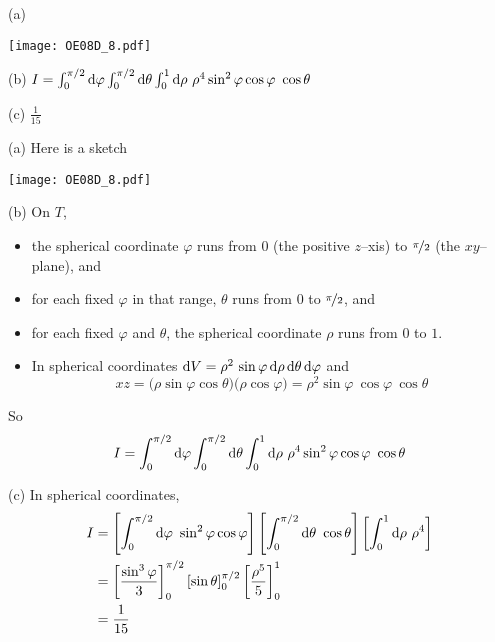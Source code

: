 %

\begin{answer}
(a)
\begin{center}
     \texttt{[image: OE08D\_8.pdf]}
\end{center}

(b) $I=\int_0^{\pi/2}\dee{\varphi}\int_0^{\pi/2}\dee{\theta}\int_0^1\dee{\rho}\ 
         \rho^4\sin^2\varphi\cos\varphi\ \cos\theta$

(c) $\frac{1}{15}$
\end{answer}

\begin{solution}
(a) Here is a sketch
\begin{center}
     \texttt{[image: OE08D\_8.pdf]}
\end{center}


(b) On $T$,
\begin{itemize}
\item
the spherical coordinate $\varphi$ runs from $0$ (the positive $z$--xis)
to $\nicefrac{\pi}{2}$ (the $xy$--plane), and
\item 
for each fixed $\varphi$ in that range,
$\theta$ runs from $0$ to $\nicefrac{\pi}{2}$, and
\item
for each fixed $\varphi$ and $\theta$, the spherical coordinate
$\rho$ runs from $0$ to $1$.
\item
In spherical coordinates 
  $\mathrm{d}V=\rho^2\,\sin\varphi\,\mathrm{d}\rho\,\mathrm{d}\theta\, \mathrm{d}\varphi$
and
\begin{equation*}
   xz=\big(\rho\sin\varphi\cos\theta\big)\big(\rho\cos\varphi\big)
      =\rho^2 \sin\varphi\ \cos\varphi\ \cos\theta
\end{equation*}
\end{itemize}
So
\begin{align*}
I=\int_0^{\pi/2}\dee{\varphi}\int_0^{\pi/2}\dee{\theta}\int_0^1\dee{\rho}\ 
         \rho^4\sin^2\varphi\cos\varphi\ \cos\theta
\end{align*} 

(c) In spherical coordinates,
\begin{align*}
I&=  \left[\int_0^{\pi/2}\dee{\varphi}\ \sin^2\varphi\cos\varphi\right]
    \left[\int_0^{\pi/2}\dee{\theta}\ \cos\theta\right]
     \left[\int_0^1\dee{\rho}\ \rho^4\right] \\
 &=\left[\frac{\sin^3\varphi}{3}\right]_0^{\pi/2}
    \left[\sin\theta\right]_0^{\pi/2}
     \left[\frac{\rho^5}{5}\right]_0^1 \\
 &=\frac{1}{15}
\end{align*}
\end{solution}


